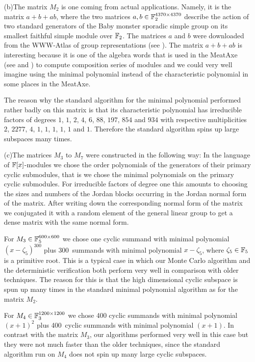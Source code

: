 (b)\quad The matrix $M_2$ is one coming from actual applications. Namely, it is
the matrix $a+b+ab$, where the two matrices $a,b \in \mathbb{F}_2^{4370 \times
4370}$ describe the action of two standard generators of the Baby monster
sporadic simple group on its smallest faithful simple module over $\mathbb{F}_2$.
The matrices $a$ and $b$ were downloaded from the WWW-Atlas of group
%
representations (see \cite{WWWAtlas}). The matrix $a+b+ab$ is
interesting because it is one of the algebra words that is used
in the {\sc MeatAxe} (see \cite{MeatAxeRP} and \cite{MeatAxeHoltRees})
to compute composition series of modules and
we could very well imagine using the minimal polynomial instead of
the characteristic polynomial in some places in the {\sc MeatAxe}.

The reason why the standard algorithm for the minimal polynomial
performed rather badly on this matrix is that its characteristic polynomial
has irreducible factors of degrees $1$, $1$, $2$, $4$, $6$, $88$,
$197$, $854$ and $934$ with respective multiplicities
$2$, $2277$, $4$, $1$, $1$, $1$, $1$, $1$ and $1$.
Therefore the standard algorithm spins up large subspaces
many times.

(c)\quad The matrices $M_3$ to $M_7$ were constructed in the following way:
In the language of $\mathbb{F}[x]$-modules we chose the order polynomials of
the generators of their primary cyclic submodules, that is we chose the
minimal polynomials on the primary cyclic submodules. For irreducible factors
of degree one this amounts to choosing the sizes and numbers of the
Jordan blocks occurring in the Jordan normal form of the matrix.
After writing down the corresponding normal form of the matrix we
conjugated it with a random element of the general linear group to
get a dense matrix with the same normal form.

For $M_3 \in \mathbb{F}_5^{600 \times 600}$ we chose one cyclic summand with
minimal polynomial $(x-\zeta_5)^{300}$ plus 300~summands with minimal
polynomial $x-\zeta_5$, where $\zeta_5 \in \mathbb{F}_5$ is a primitive root.
This is a typical case in which our Monte Carlo algorithm and
the deterministic verification both perform very well in comparison
%
with older techniques. The reason for this is that the high dimensional
cyclic subspace is spun up many times in the standard minimal polynomial
algorithm as for the matrix $M_2$.

For $M_4 \in \mathbb{F}_3^{1200 \times 1200}$ we chose 400 cyclic summands with
minimal polynomial $(x+1)^2$ plus 400~cyclic summands with
minimal polynomial $(x+1)$.
In contrast with the matrix $M_3$,  our algorithms 
performed very well in this case but they were not
much faster than the older techniques, since the standard algorithm
run on $M_4$ does not spin up many large cyclic subspaces.


